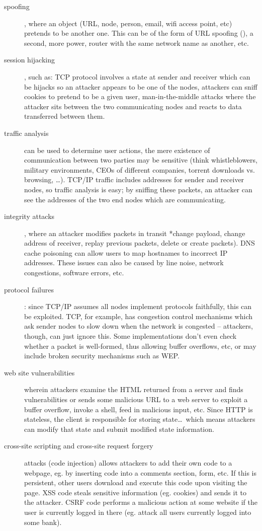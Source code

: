 \documentclass[12pt]{article}
\begin{document}
\begin{description}
\item[spoofing], where an object (URL, node, person, email, wifi access point, etc) pretends to be another one. This can be of the form of URL spoofing (), a second, more power, router with the same network name as another, etc.
\item[session hijacking], such as: TCP protocol involves a state at sender and receiver which can be hijacks so an attacker appears to be one of the nodes, attackers can sniff cookies to pretend to be a given user, man-in-the-middle attacks where the attacker sits between the two communicating nodes and reacts to data transferred between them.
\item[traffic analysis] can be used to determine user actions, the mere existence of communication between two parties may be sensitive (think whistleblowers, military environments, CEOs of different companies, torrent downloads vs. browsing, \dots). TCP/IP traffic includes addresses for sender and receiver nodes, so traffic analysis is easy; by sniffing these packets, an attacker can see the addresses of the two end nodes which are communicating.
\item[integrity attacks], where an attacker modifies packets in transit *change payload, change address of receiver, replay previous packets, delete or create packets). DNS cache poisoning can allow users to map hostnames to incorrect IP addresses. These issues can also be caused by line noise, network congestions, software errors, etc.
\item[protocol failures]: since TCP/IP assumes all nodes implement protocols faithfully, this can be exploited. TCP, for example, has congestion control mechanisms which ask sender nodes to slow down when the network is congested -- attackers, though, can just ignore this. Some implementations don't even check whether a packet is well-formed, thus allowing buffer overflows, etc, or may include broken security mechanisms such as WEP.
\item[web site vulnerabilities] wherein attackers examine the HTML returned from a server and finds vulnerabilities or sends some malicious URL to a web server to exploit a buffer overflow, invoke a shell, feed in malicious input, etc. Since HTTP is stateless, the client is responsible for storing state\dots\ which means attackers can modify that state and submit modified state information.
\item[cross-site scripting and cross-site request forgery] attacks (code injection) allows attackers to add their own code to a webpage, eg. by inserting code into a comments section, form, etc. If this is persistent, other users download and execute this code upon visiting the page. XSS code steals sensitive information (eg. cookies) and sends it to the attacker. CSRF code performs a malicious action at some website if the user is currently logged in there (eg. attack all users currently logged into some bank).

\end{description}
\end{document}
